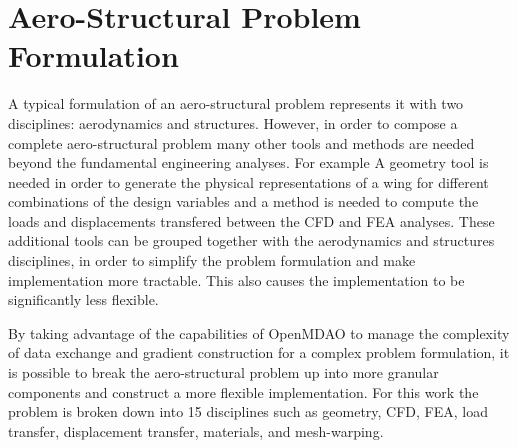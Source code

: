 \documentclass[]{aiaa-tc} %
\begin{document}
  \section{Aero-Structural Problem Formulation}

  A typical formulation of an aero-structural problem represents it with two disciplines: aerodynamics and structures. 
  However, in order to compose a complete aero-structural problem many other tools and methods are needed beyond the 
  fundamental engineering analyses. For example A geometry tool is needed in order to generate the physical representations 
  of a wing for different combinations of the design variables and a method is needed to compute the loads and displacements 
  transfered between the CFD and FEA analyses. These additional tools can be grouped together with the aerodynamics and 
  structures disciplines, in order to simplify the problem formulation and make implementation more tractable. This also 
  causes the implementation to be significantly less flexible. 

  By taking advantage of the capabilities of OpenMDAO to manage the complexity of data exchange and gradient construction 
  for a complex problem formulation, it is possible to break the aero-structural problem up into more granular components 
  and construct a more flexible implementation. For this work the problem is broken down into 15 disciplines such as 
  geometry, CFD, FEA, load transfer, displacement transfer, materials, and mesh-warping.

\end{document}
